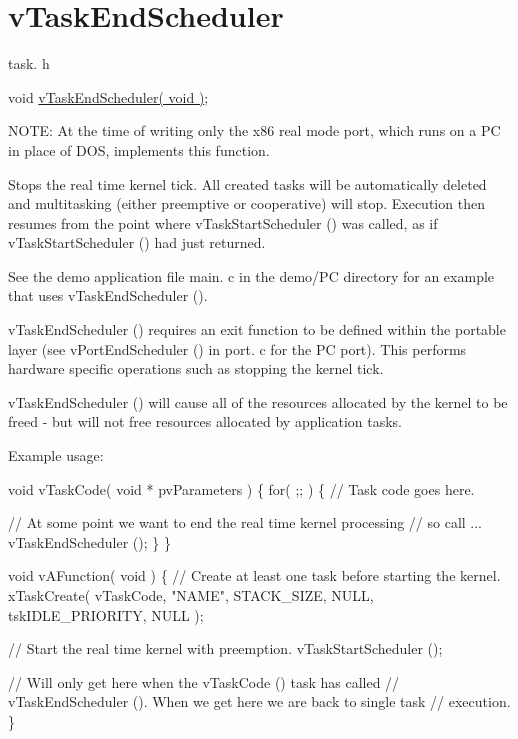 \hypertarget{group__vTaskEndScheduler}{}\section{v\+Task\+End\+Scheduler}
\label{group__vTaskEndScheduler}
task. h 
\begin{DoxyPre}void \hyperlink{task_8h_a1651e13c7ccd6273f53a62425ec79a15}{vTaskEndScheduler( void )};\end{DoxyPre}


N\+O\+TE\+: At the time of writing only the x86 real mode port, which runs on a PC in place of D\+OS, implements this function.

Stops the real time kernel tick. All created tasks will be automatically deleted and multitasking (either preemptive or cooperative) will stop. Execution then resumes from the point where v\+Task\+Start\+Scheduler () was called, as if v\+Task\+Start\+Scheduler () had just returned.

See the demo application file main. c in the demo/\+PC directory for an example that uses v\+Task\+End\+Scheduler ().

v\+Task\+End\+Scheduler () requires an exit function to be defined within the portable layer (see v\+Port\+End\+Scheduler () in port. c for the PC port). This performs hardware specific operations such as stopping the kernel tick.

v\+Task\+End\+Scheduler () will cause all of the resources allocated by the kernel to be freed -\/ but will not free resources allocated by application tasks.

Example usage\+: 
\begin{DoxyPre}
void vTaskCode( void * pvParameters )
\{
    for( ;; )
    \{
     // Task code goes here.\end{DoxyPre}



\begin{DoxyPre}     // At some point we want to end the real time kernel processing
     // so call ...
     vTaskEndScheduler ();
    \}
\}\end{DoxyPre}



\begin{DoxyPre}void vAFunction( void )
\{
    // Create at least one task before starting the kernel.
    xTaskCreate( vTaskCode, "NAME", STACK\_SIZE, NULL, tskIDLE\_PRIORITY, NULL );\end{DoxyPre}



\begin{DoxyPre}    // Start the real time kernel with preemption.
    vTaskStartScheduler ();\end{DoxyPre}



\begin{DoxyPre}    // Will only get here when the vTaskCode () task has called
    // vTaskEndScheduler ().  When we get here we are back to single task
    // execution.
\}
  \end{DoxyPre}
 